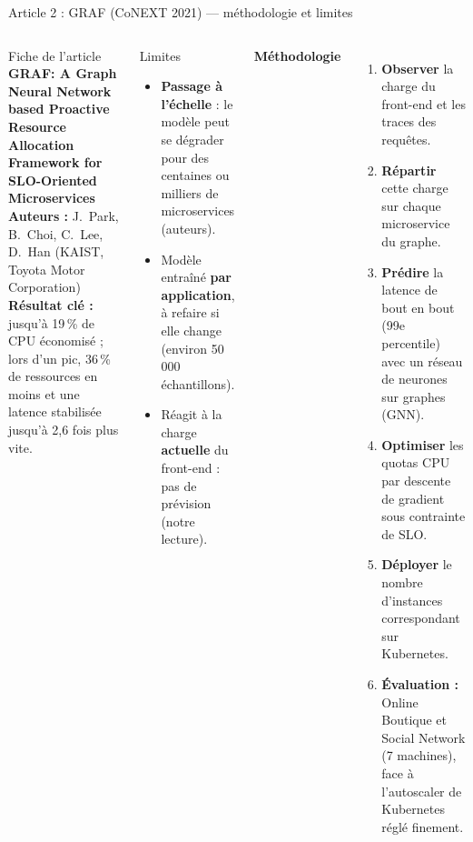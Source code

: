 \documentclass[aspectratio=169,10pt]{beamer}
\begin{document}
\begin{frame}{Article 2 : GRAF (CoNEXT 2021) --- méthodologie et limites}
  \begin{columns}[T]
    \begin{block}{Fiche de l'article}
      \scriptsize
      \textbf{GRAF: A Graph Neural Network based Proactive Resource Allocation Framework for SLO-Oriented Microservices}\\[2pt]
      \textbf{Auteurs :} J.~Park, B.~Choi, C.~Lee, D.~Han (KAIST, Toyota Motor Corporation)\\[2pt]
      \textbf{Résultat clé :} jusqu'à 19\,\% de CPU économisé ; lors d'un pic, 36\,\% de ressources en moins et une latence stabilisée jusqu'à 2,6 fois plus vite.
    \end{block}
    \begin{alertblock}{Limites}
      \scriptsize
      \begin{itemize}
        \item \textbf{Passage à l'échelle} : le modèle peut se dégrader pour des centaines ou milliers de microservices (auteurs).
        \item Modèle entraîné \textbf{par application}, à refaire si elle change (environ 50\,000 échantillons).
        \item Réagit à la charge \textbf{actuelle} du front-end : pas de prévision (notre lecture).
      \end{itemize}
    \end{alertblock}

    \textbf{Méthodologie}
    \small
    \begin{enumerate}
      \item \textbf{Observer} la charge du front-end et les traces des requêtes.
      \item \textbf{Répartir} cette charge sur chaque microservice du graphe.
      \item \textbf{Prédire} la latence de bout en bout (99e percentile) avec un réseau de neurones sur graphes (GNN).
      \item \textbf{Optimiser} les quotas CPU par descente de gradient sous contrainte de SLO.
      \item \textbf{Déployer} le nombre d'instances correspondant sur Kubernetes.
      \item \textbf{Évaluation :} Online Boutique et Social Network (7 machines), face à l'autoscaler de Kubernetes réglé finement.
    \end{enumerate}
  \end{columns}
\end{frame}
\end{document}
